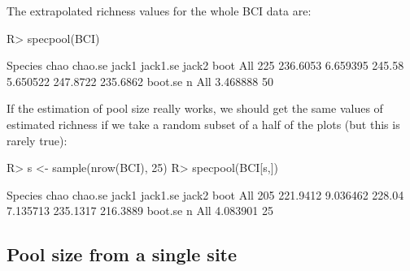 \documentclass[article,nojss]{jss}
\begin{document}
The extrapolated richness values for the whole BCI data are:
\begin{Schunk}
\begin{Sinput}
R> specpool(BCI)
\end{Sinput}
\begin{Soutput}
    Species     chao  chao.se  jack1 jack1.se    jack2     boot
All     225 236.6053 6.659395 245.58 5.650522 247.8722 235.6862
     boot.se  n
All 3.468888 50
\end{Soutput}
\end{Schunk}
If the estimation of pool size really works, we should get the same
values of estimated richness if we take a random subset of a half of
the plots (but this is rarely true):
\begin{Schunk}
\begin{Sinput}
R> s <- sample(nrow(BCI), 25)
R> specpool(BCI[s,])
\end{Sinput}
\begin{Soutput}
    Species     chao  chao.se  jack1 jack1.se    jack2     boot
All     205 221.9412 9.036462 228.04 7.135713 235.1317 216.3889
     boot.se  n
All 4.083901 25
\end{Soutput}
\end{Schunk}

\subsection{Pool size from a single site}
\end{document}
